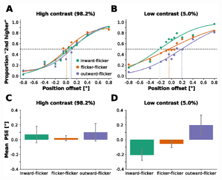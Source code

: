 \begin{figure}[htb!]
\captionsetup{labelformat=empty}
\centering
\includegraphics[width=\textwidth]{figures/chapter_04/fig3.eps}
\caption{}
\end{figure}

